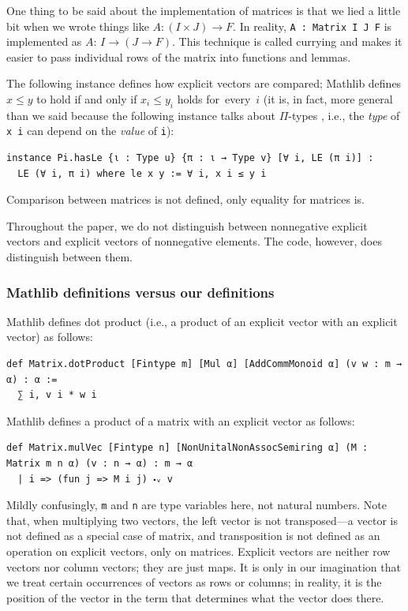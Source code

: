 \documentclass[]{article}
\renewcommand{\.}{\hskip .75pt}
\let\r=\rightarrow
\begin{document}
One thing to be said about the implementation of matrices is that we lied
a little bit when we wrote things like $A : (I \times J) \r F$.
In reality, \texttt{A : Matrix I J F} is implemented as $A : \,I \r (J \r F)$.
This technique \cite{Currying} is called currying and makes it easier to
pass individual rows of the matrix into functions and lemmas.
\pagebreak[2]

The following instance defines how explicit vectors are compared;
Mathlib defines $x \le y$ to hold if and only if
$x_i \le y_i$ holds for~every~$i$ %
(it is, in fact, more general than we said because the following instance
talks about $\Pi$-types \cite{MLTT}, i.e.,
the \textit{type} of \texttt{x i} can depend on the \textit{value} of \texttt{i}):
\begin{lstlisting}
instance Pi.hasLe {ι : Type u} {π : ι → Type v} [∀ i, LE (π i)] :
  LE (∀ i, π i) where le x y := ∀ i, x i ≤ y i
\end{lstlisting}
Comparison between matrices is not defined, only equality for matrices is.

Throughout the paper, we do not distinguish between
nonnegative explicit vectors and explicit vectors of nonnegative elements.
The code, however, does distinguish between them.

\subsubsection{Mathlib definitions versus our definitions}
\label{versus}

Mathlib defines dot product (i.e., a product of an explicit vector with an explicit vector) as follows:
\begin{lstlisting}
def Matrix.dotProduct [Fintype m] [Mul α] [AddCommMonoid α] (v w : m → α) : α :=
  ∑ i, v i * w i
\end{lstlisting}
Mathlib defines a product of a matrix with an explicit vector as follows:
\begin{lstlisting}
def Matrix.mulVec [Fintype n] [NonUnitalNonAssocSemiring α] (M : Matrix m n α) (v : n → α) : m → α
  | i => (fun j => M i j) ⬝ᵥ v
\end{lstlisting}
Mildly confusingly, \texttt{m} and \texttt{n} are type variables here, not natural numbers.
Note that, when multiplying two vectors,
the left vector is not transposed\:---\:a vector is not
defined as a special case of matrix, and transposition is not
defined as an operation on explicit vectors, only on matrices.
Explicit vectors are neither row vectors nor column vectors;
they are just maps. It is only in our imagination that we
treat certain occurrences of vectors as rows or columns;
in reality, it is the position of the vector in the term that
determines what the vector does there.
\end{document}
